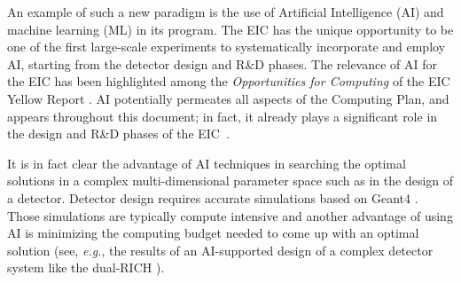 %
%
%

An example of such a new paradigm is the use of Artificial Intelligence (AI) and machine learning (ML) in its program. The EIC has the unique opportunity to be one of the first large-scale experiments to systematically incorporate and employ AI, starting from the detector design and R\&D phases. 
The relevance of AI for the EIC has been highlighted among the \textit{Opportunities for Computing} of the EIC Yellow Report \cite{eic_yellow_report_v1_1}. AI potentially permeates all aspects of the Computing Plan, and appears throughout this document; in fact, it already plays a significant role in the design and R\&D phases of the EIC~\cite{cisbani2020ai}.




It is in fact clear the advantage of AI techniques in searching the optimal solutions in a complex multi-dimensional parameter space such as in the design of a detector. Detector design requires accurate simulations based on Geant4 \cite{ALLISON2016186}. Those simulations are typically compute intensive and another advantage of using AI is minimizing the computing budget needed to come up with an optimal solution (see, \textit{e.g.}, the results of an AI-supported design of a complex detector system like the dual-RICH \cite{cisbani2020ai}).

